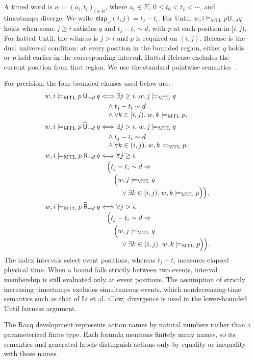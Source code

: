 \documentclass{ieeeaccess}
\newcommand{\Nat}{\mathbb{N}}
\newcommand{\satM}{\models_{\mathrm{MTL}}}
\newcommand{\Until}{\mathbin{\mathsf{U}}}
\newcommand{\Release}{\mathbin{\mathsf{R}}}
\newcommand{\hUntil}{\mathbin{\widehat{\mathsf{U}}}}
\newcommand{\hRelease}{\mathbin{\widehat{\mathsf{R}}}}
\newcommand{\elapsed}{\mathsf{elap}}
\begin{document}
A timed word is $w=(a_i,t_i)_{i\in\Nat}$, where $a_i\in\Sigma$,
$0\le t_0<t_1<\cdots$, and timestamps diverge. We write
$\elapsed_w(i,j)=t_j-t_i$. For Until, $w,i\satM p\Until_{\sim d}q$
holds when some $j\ge i$ satisfies $q$ and $t_j-t_i\sim d$, with $p$ at
each position in $[i,j)$. For hatted Until, the witness is $j>i$ and $p$
is required on $(i,j)$. Release is the dual universal condition: at every
position in the bounded region, either $q$ holds or $p$ held earlier in the
corresponding interval. Hatted Release excludes the current position from
that region. We use the standard pointwise semantics~\cite{MTLsem}.

For precision, the four bounded clauses used below are:
\begin{align*}
 w,i\satM p\Until_{\sim d}q
 &\Longleftrightarrow \exists j\ge i.\; w,j\satM q\\
 &\quad\land t_j-t_i\sim d\\[-1mm]
 &\quad\land \forall k\in[i,j).\;w,k\satM p,\\
 w,i\satM p\hUntil_{\sim d}q
 &\Longleftrightarrow \exists j>i.\; w,j\satM q\\
 &\quad\land t_j-t_i\sim d\\[-1mm]
 &\quad\land \forall k\in(i,j).\;w,k\satM p,\\
 w,i\satM p\Release_{\sim d}q
 &\Longleftrightarrow \forall j\ge i.\\[-1mm]
 &\quad\Bigl(t_j-t_i\sim d\Rightarrow\\[-1mm]
 &\qquad\Bigl(w,j\satM q\\[-1mm]
 &\qquad\quad\lor \exists k\in[i,j).\;w,k\satM p\Bigr)\Bigr),\\
 w,i\satM p\hRelease_{\sim d}q
 &\Longleftrightarrow \forall j>i.\\[-1mm]
 &\quad\Bigl(t_j-t_i\sim d\Rightarrow\\[-1mm]
 &\qquad\Bigl(w,j\satM q\\[-1mm]
 &\qquad\quad\lor \exists k\in(i,j).\;w,k\satM p\Bigr)\Bigr).
\end{align*}
The index intervals select event positions, whereas $t_j-t_i$ measures
elapsed physical time. When a bound falls strictly between two events, interval membership is still
evaluated only at event positions.
The assumption of strictly increasing timestamps excludes simultaneous events,
which nondecreasing-time semantics such as that of Li et al. allow; divergence is
used in the lower-bounded Until fairness argument.

The Rocq development represents action names by natural numbers rather than a
parameterized finite type. Each formula mentions finitely many names, so its semantics and generated
labels distinguish actions only by equality or inequality with those names.
\end{document}
